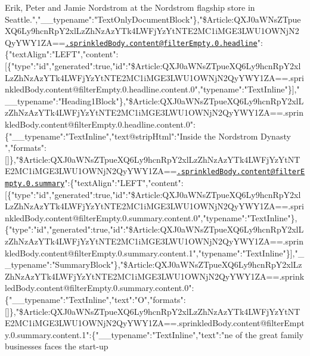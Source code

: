 Erik, Peter and Jamie Nordstrom at the Nordstrom flagship store in
Seattle.","\_\_typename":"TextOnlyDocumentBlock"\},"\$Article:QXJ0aWNsZTpueXQ6Ly9hcnRpY2xlLzZhNzAzYTk4LWFjYzYtNTE2MC1iMGE3LWU1OWNjN2QyYWY1ZA==\href{mailto:.sprinkledBody.content@filterEmpty.0.headline}{\nolinkurl{.sprinkledBody.content@filterEmpty.0.headline}}":\{"textAlign":"LEFT","content":{[}\{"type":"id","generated":true,"id":"\$Article:QXJ0aWNsZTpueXQ6Ly9hcnRpY2xlLzZhNzAzYTk4LWFjYzYtNTE2MC1iMGE3LWU1OWNjN2QyYWY1ZA==.sprinkledBody.content@filterEmpty.0.headline.content.0","typename":"TextInline"\}{]},"\_\_typename":"Heading1Block"\},"\$Article:QXJ0aWNsZTpueXQ6Ly9hcnRpY2xlLzZhNzAzYTk4LWFjYzYtNTE2MC1iMGE3LWU1OWNjN2QyYWY1ZA==.sprinkledBody.content@filterEmpty.0.headline.content.0":\{"\_\_typename":"TextInline","text@stripHtml":"Inside
the Nordstrom Dynasty
","formats":{[}{]}\},"\$Article:QXJ0aWNsZTpueXQ6Ly9hcnRpY2xlLzZhNzAzYTk4LWFjYzYtNTE2MC1iMGE3LWU1OWNjN2QyYWY1ZA==\href{mailto:.sprinkledBody.content@filterEmpty.0.summary}{\nolinkurl{.sprinkledBody.content@filterEmpty.0.summary}}":\{"textAlign":"LEFT","content":{[}\{"type":"id","generated":true,"id":"\$Article:QXJ0aWNsZTpueXQ6Ly9hcnRpY2xlLzZhNzAzYTk4LWFjYzYtNTE2MC1iMGE3LWU1OWNjN2QyYWY1ZA==.sprinkledBody.content@filterEmpty.0.summary.content.0","typename":"TextInline"\},\{"type":"id","generated":true,"id":"\$Article:QXJ0aWNsZTpueXQ6Ly9hcnRpY2xlLzZhNzAzYTk4LWFjYzYtNTE2MC1iMGE3LWU1OWNjN2QyYWY1ZA==.sprinkledBody.content@filterEmpty.0.summary.content.1","typename":"TextInline"\}{]},"\_\_typename":"SummaryBlock"\},"\$Article:QXJ0aWNsZTpueXQ6Ly9hcnRpY2xlLzZhNzAzYTk4LWFjYzYtNTE2MC1iMGE3LWU1OWNjN2QyYWY1ZA==.sprinkledBody.content@filterEmpty.0.summary.content.0":\{"\_\_typename":"TextInline","text":"O","formats":{[}{]}\},"\$Article:QXJ0aWNsZTpueXQ6Ly9hcnRpY2xlLzZhNzAzYTk4LWFjYzYtNTE2MC1iMGE3LWU1OWNjN2QyYWY1ZA==.sprinkledBody.content@filterEmpty.0.summary.content.1":\{"\_\_typename":"TextInline","text":"ne
of the great family businesses faces the start-up
